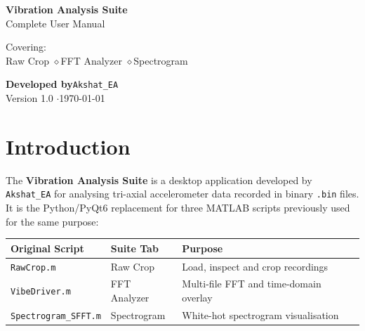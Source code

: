 \documentclass[12pt, a4paper]{article}
\begin{document}
\begin{titlepage}
\pagecolor{headerbg}
\color{headertext}
\vspace*{2cm}
\begin{center}
  {\fontsize{36}{44}\selectfont\bfseries Vibration Analysis Suite}\\[0.6cm]
  {\Large\color{muted} Complete User Manual}\\[2.5cm]

  \begin{mdframed}[linecolor=accent, linewidth=1.5pt,
                   backgroundcolor=headerbg,
                   leftmargin=2cm, rightmargin=2cm,
                   innertopmargin=12pt, innerbottommargin=12pt]
    \centering
    {\large Covering:}\\[0.4cm]
    {\normalsize
      Raw Crop \quad$\diamond$\quad FFT Analyzer \quad$\diamond$\quad Spectrogram
    }
  \end{mdframed}

  \vfill
  {\large\bfseries Developed by\;}{\large\color{accent}\texttt{Akshat\_EA}}\\[0.4cm]
  {\color{muted}\small Version 1.0 \quad$\cdot$\quad \today}
\end{center}
\end{titlepage}
\nopagecolor

\newpage
\tableofcontents
\newpage

\section{Introduction}

The \textbf{Vibration Analysis Suite} is a desktop application developed by
\texttt{Akshat\_EA} for analysing tri-axial accelerometer data recorded in
binary \texttt{.bin} files.  It is the Python/PyQt6 replacement for three
MATLAB scripts previously used for the same purpose:

\begin{center}
\begin{tabular}{lll}
\toprule
\textbf{Original Script} & \textbf{Suite Tab} & \textbf{Purpose}\\
\midrule
\texttt{RawCrop.m}           & Raw Crop       & Load, inspect and crop recordings \\
\texttt{VibeDriver.m}        & FFT Analyzer   & Multi-file FFT and time-domain overlay \\
\texttt{Spectrogram\_SFFT.m} & Spectrogram    & White-hot spectrogram visualisation \\
\bottomrule
\end{tabular}
\end{center}
\end{document}
